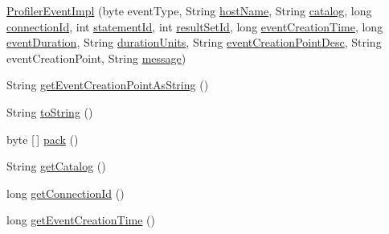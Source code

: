 \begin{DoxyCompactItemize}
\item 
\mbox{\hyperlink{classcom_1_1mysql_1_1cj_1_1log_1_1_profiler_event_impl_a2de358527d7de9c58f280d4843974a2a}{Profiler\+Event\+Impl}} (byte event\+Type, String \mbox{\hyperlink{classcom_1_1mysql_1_1cj_1_1log_1_1_profiler_event_impl_aa8efa2a90b158d0fa4dfdc0e85a90f85}{host\+Name}}, String \mbox{\hyperlink{classcom_1_1mysql_1_1cj_1_1log_1_1_profiler_event_impl_ad98c4eaf20d8287d3ffe0ce846c29176}{catalog}}, long \mbox{\hyperlink{classcom_1_1mysql_1_1cj_1_1log_1_1_profiler_event_impl_a264164abd2686e4a44131114156452d7}{connection\+Id}}, int \mbox{\hyperlink{classcom_1_1mysql_1_1cj_1_1log_1_1_profiler_event_impl_af16efdf6c64d552484266a63d97fd77d}{statement\+Id}}, int \mbox{\hyperlink{classcom_1_1mysql_1_1cj_1_1log_1_1_profiler_event_impl_a8827c310fa8083835fe1e9ff62a47a07}{result\+Set\+Id}}, long \mbox{\hyperlink{classcom_1_1mysql_1_1cj_1_1log_1_1_profiler_event_impl_adabab2102bc799a1e96b8dbe1fb86d51}{event\+Creation\+Time}}, long \mbox{\hyperlink{classcom_1_1mysql_1_1cj_1_1log_1_1_profiler_event_impl_af97edaeaff6563c834b1ea6262e53e5c}{event\+Duration}}, String \mbox{\hyperlink{classcom_1_1mysql_1_1cj_1_1log_1_1_profiler_event_impl_a850355145b304246e6b533a25a4dfe32}{duration\+Units}}, String \mbox{\hyperlink{classcom_1_1mysql_1_1cj_1_1log_1_1_profiler_event_impl_a42cbd6a7cb56109f08db67263beee178}{event\+Creation\+Point\+Desc}}, String event\+Creation\+Point, String \mbox{\hyperlink{classcom_1_1mysql_1_1cj_1_1log_1_1_profiler_event_impl_a0db7c3af48a3c0c71052ef2b495b9396}{message}})
\item 
String \mbox{\hyperlink{classcom_1_1mysql_1_1cj_1_1log_1_1_profiler_event_impl_aadc8269b69fc66e1c421d5a18e834ceb}{get\+Event\+Creation\+Point\+As\+String}} ()
\item 
String \mbox{\hyperlink{classcom_1_1mysql_1_1cj_1_1log_1_1_profiler_event_impl_af15f923f719f69a63c271705386924b1}{to\+String}} ()
\item 
byte \mbox{[}$\,$\mbox{]} \mbox{\hyperlink{classcom_1_1mysql_1_1cj_1_1log_1_1_profiler_event_impl_a5586e172eb7af1a0374145d8afba72ba}{pack}} ()
\item 
String \mbox{\hyperlink{classcom_1_1mysql_1_1cj_1_1log_1_1_profiler_event_impl_a78b1417ac3c37a238b864c8ab4a4979f}{get\+Catalog}} ()
\item 
long \mbox{\hyperlink{classcom_1_1mysql_1_1cj_1_1log_1_1_profiler_event_impl_ac9658ff85b167806a14fb3496d97372b}{get\+Connection\+Id}} ()
\item 
long \mbox{\hyperlink{classcom_1_1mysql_1_1cj_1_1log_1_1_profiler_event_impl_a813e48b37bcb0b9c5169a262801f4d00}{get\+Event\+Creation\+Time}} ()

\end{DoxyCompactItemize}
